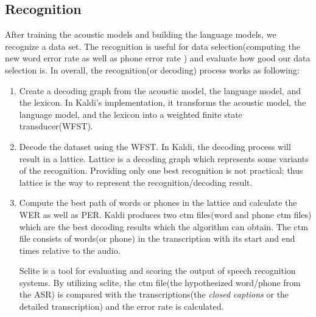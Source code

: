 \subsection{Recognition}
After training the acoustic models and building the language models, we recognize a data set. The recognition is useful for data selection(computing the new word error rate as well as phone error rate ) and evaluate how good our data selection is. In overall, the recognition(or decoding) process works as following:
\begin{enumerate}
\item Create a decoding graph from the acoustic model, the language model, and the lexicon. In Kaldi's implementation, it transforms the  acoustic model, the language model, and the lexicon into a weighted finite state transducer(WFST).
\item Decode the dataset using the WFST. In Kaldi, the decoding process will result in a lattice. Lattice is a decoding graph which represents some variants of the recognition. Providing only one best recognition is not practical; thus lattice is the way to represent the recognition/decoding result. 
\item Compute the best path of words or phones in the lattice and calculate the WER as well as PER. Kaldi produces two ctm files(word and phone ctm files) which are the best decoding results which the algorithm can obtain. The ctm file consists of words(or phone) in the transcription with its start and end times relative to the audio. 

Sclite is a tool for evaluating and scoring the output of speech recognition systems. By utilizing sclite, the ctm file(the hypothesized word/phone from the ASR) is compared with the transcriptions(the \textit{closed captions} or the detailed transcription) and the error rate is calculated.  
\end{enumerate}

